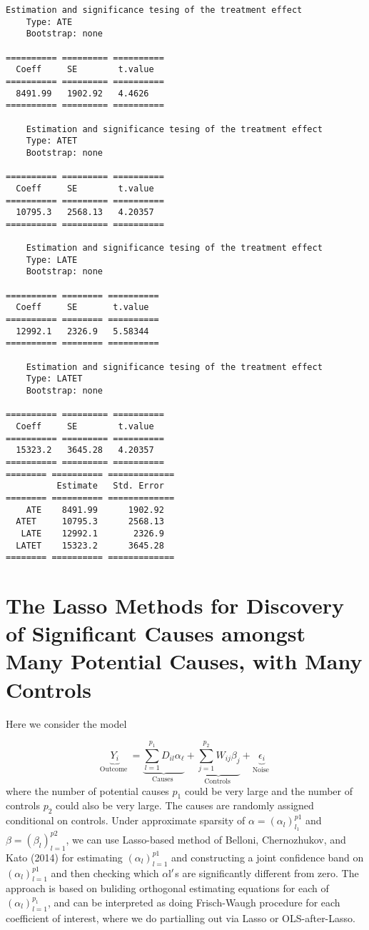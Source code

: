 \documentclass[12pt,a4paper]{article}
\begin{document}
\begin{lstlisting}
Estimation and significance tesing of the treatment effect
    Type: ATE
    Bootstrap: none
    
========== ========= ==========
  Coeff     SE        t.value
========== ========= ==========
  8491.99   1902.92   4.4626
========== ========= ==========

    Estimation and significance tesing of the treatment effect
    Type: ATET
    Bootstrap: none
    
========== ========= ==========
  Coeff     SE        t.value
========== ========= ==========
  10795.3   2568.13   4.20357
========== ========= ==========

    Estimation and significance tesing of the treatment effect
    Type: LATE
    Bootstrap: none
    
========== ======== ==========
  Coeff     SE       t.value
========== ======== ==========
  12992.1   2326.9   5.58344
========== ======== ==========

    Estimation and significance tesing of the treatment effect
    Type: LATET
    Bootstrap: none
    
========== ========= ==========
  Coeff     SE        t.value
========== ========= ==========
  15323.2   3645.28   4.20357
========== ========= ==========
======== ========== =============
          Estimate   Std. Error
======== ========== =============
    ATE    8491.99      1902.92
  ATET     10795.3      2568.13
   LATE    12992.1       2326.9
  LATET    15323.2      3645.28
======== ========== =============
\end{lstlisting}


\section{The Lasso Methods for Discovery of Significant Causes amongst Many Potential Causes, with Many Controls}
Here we consider the model 

\[
\underbrace{Y_i}_{\text {Outcome }}=\underbrace{\sum_{l=1}^{p_1} D_{i l} \alpha_{\ell}}_{\text {Causes }}+\underbrace{\sum_{j=1}^{p_2} W_{i j} \beta_j}_{\text {Controls }}+\underbrace{\epsilon_i}_{\text {Noise }}
\]
where the number of potential causes $p_1$ could be very large and the number of controls $p_2$ could also be very large. The causes are randomly assigned conditional on controls. Under approximate sparsity of $\alpha = (\alpha_l)_{l_1}^{p1}$ and $\beta = (\beta_l)_{l=1}^{p2}$, we can use Lasso-based method of Belloni, Chernozhukov, and Kato (2014) for estimating $(\alpha_l)_{l=1}^{p1}$ and constructing a joint confidence band on $(\alpha_l)_{l=1}^{p1}$ and then checking which $\alpha$l\ensuremath{\rq}s are significantly different from zero. The approach is based on buliding orthogonal estimating equations for each of $(\alpha_l)_{l=1}^{p_1}$, and can be interpreted as doing Frisch-Waugh procedure for each coefficient of interest, where we do partialling out via Lasso or OLS-after-Lasso.
\end{document}
